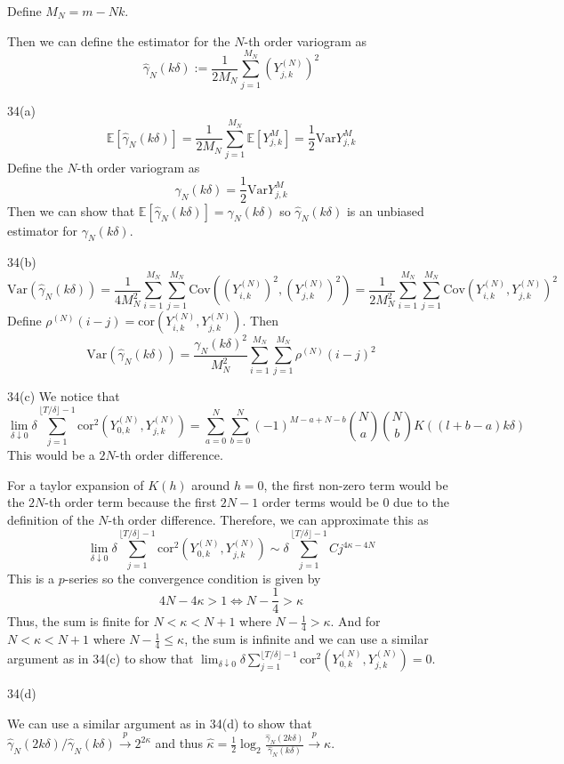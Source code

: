 \documentclass{article}
\begin{document}
Define $M_N = m - Nk$.

Then we can define the estimator for the $N$-th order variogram as
$$ \hat \gamma_N(k\delta) := \frac{1}{2M_N} \sum_{j=1}^{M_N} (Y_{j,k}^{(N)})^2 $$


34(a)
$$\mathbb{E}[\hat \gamma_N (k \delta)] = \frac{1}{2M_N}\sum_{j=1}^{M_N} \mathbb{E}[Y_{j,k}^M] = \frac{1}{2} \text{Var}Y_{j,k}^M $$
Define the $N$-th order variogram as 
$$\gamma_N(k\delta) = \frac{1}{2} \text{Var}Y_{j,k}^M$$
Then we can show that $\mathbb{E}[\hat \gamma_N(k\delta)] = \gamma_N(k\delta)$ so $\hat \gamma_N(k\delta)$ is an unbiased estimator for $\gamma_N(k\delta)$.

34(b)
$$ \text{Var}(\hat \gamma_N(k\delta)) = \frac{1}{4M_N^2} \sum_{i=1}^{M_N} \sum_{j=1}^{M_N} \text{Cov}((Y_{i,k}^{(N)})^2, (Y_{j,k}^{(N)})^2) = \frac{1}{2M_N^2} \sum_{i=1}^{M_N} \sum_{j=1}^{M_N} \text{Cov}(Y_{i,k}^{(N)}, Y_{j,k}^{(N)})^2 $$
Define $\rho^{(N)}(i-j) = \text{cor}(Y_{i,k}^{(N)}, Y_{j,k}^{(N)})$. Then
$$ \text{Var}(\hat \gamma_N(k\delta)) = \frac{\gamma_N(k\delta)^2}{M_N^2} \sum_{i=1}^{M_N} \sum_{j=1}^{M_N} \rho^{(N)}(i-j)^2 $$

34(c)
We notice that
$$ \lim_{\delta \downarrow 0} \delta \sum_{j=1}^{\lfloor T/\delta \rfloor - 1} \text{cor}^2(Y_{0,k}^{(N)}, Y_{j,k}^{(N)}) = \sum_{a=0}^{N} \sum_{b=0}^{N} (-1)^{M-a+N-b} \binom{N}{a} \binom{N}{b} K((l+b-a)k\delta)$$
This would be a $2N$-th order difference. 

For a taylor expansion of $K(h)$ around $h=0$, the first non-zero term would be the $2N$-th order term because the first $2N-1$ order terms would be 0 due to the definition of the $N$-th order difference. Therefore, we can approximate this as
$$ \lim_{\delta \downarrow 0} \delta \sum_{j=1}^{\lfloor T/\delta \rfloor - 1} \text{cor}^2(Y_{0,k}^{(N)}, Y_{j,k}^{(N)}) \sim \delta \sum_{j=1}^{\lfloor T/\delta \rfloor - 1} C j^{4\kappa - 4N}$$
This is a $p$-series so the convergence condition is given by
$$4N - 4\kappa > 1 \iff N - \frac{1}{4} > \kappa$$
Thus, the sum is finite for $N < \kappa < N + 1$ where $N - \frac{1}{4} > \kappa$.
And for $N < \kappa < N + 1$ where $N - \frac{1}{4} \leq \kappa$, the sum is infinite and we can use a similar argument as in 34(c) to show that $\lim_{\delta \downarrow 0} \delta \sum_{j=1}^{\lfloor T/\delta \rfloor - 1} \text{cor}^2(Y_{0,k}^{(N)}, Y_{j,k}^{(N)}) = 0$.

34(d)

We can use a similar argument as in 34(d) to show that $\hat \gamma_N(2k\delta)/\hat \gamma_N(k\delta) \xrightarrow{p} 2^{2\kappa}$ and thus $\hat \kappa = \frac{1}{2} \log_2 \frac{\hat \gamma_N(2k\delta)}{\hat \gamma_N(k\delta)} \xrightarrow{p} \kappa$.
\end{document}
